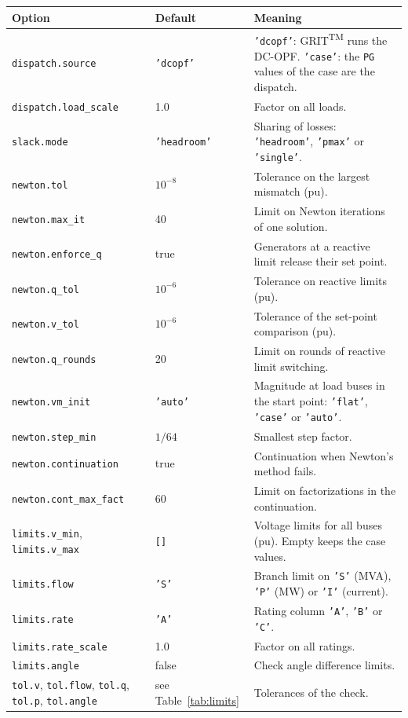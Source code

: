 \documentclass[a4paper,11pt]{article}
\newcommand{\TM}{\textsuperscript{TM}}
\newcommand{\GRIT}{GRIT\TM}
\newcommand{\opt}[1]{\texttt{#1}}
\begin{document}
\begin{longtable}{@{}p{4.2cm}p{2.0cm}p{8.6cm}@{}}
\toprule
\textbf{Option} & \textbf{Default} & \textbf{Meaning} \\
\midrule
\endhead
\opt{dispatch.source} & \texttt{'dcopf'} & \texttt{'dcopf'}: \GRIT{} runs the DC-OPF. \texttt{'case'}: the \texttt{PG} values of the case are the dispatch. \\
\opt{dispatch.load\_scale} & 1.0 & Factor on all loads. \\
\opt{slack.mode} & \texttt{'headroom'} & Sharing of losses: \texttt{'headroom'}, \texttt{'pmax'} or \texttt{'single'}. \\
\opt{newton.tol} & $10^{-8}$ & Tolerance on the largest mismatch (pu). \\
\opt{newton.max\_it} & 40 & Limit on Newton iterations of one solution. \\
\opt{newton.enforce\_q} & true & Generators at a reactive limit release their set point. \\
\opt{newton.q\_tol} & $10^{-6}$ & Tolerance on reactive limits (pu). \\
\opt{newton.v\_tol} & $10^{-6}$ & Tolerance of the set-point comparison (pu). \\
\opt{newton.q\_rounds} & 20 & Limit on rounds of reactive limit switching. \\
\opt{newton.vm\_init} & \texttt{'auto'} & Magnitude at load buses in the start point: \texttt{'flat'}, \texttt{'case'} or \texttt{'auto'}. \\
\opt{newton.step\_min} & $1/64$ & Smallest step factor. \\
\opt{newton.continuation} & true & Continuation when Newton's method fails. \\
\opt{newton.cont\_max\_fact} & 60 & Limit on factorizations in the continuation. \\
\opt{limits.v\_min}, \opt{limits.v\_max} & \texttt{[]} & Voltage limits for all buses (pu). Empty keeps the case values. \\
\opt{limits.flow} & \texttt{'S'} & Branch limit on \texttt{'S'} (MVA), \texttt{'P'} (MW) or \texttt{'I'} (current). \\
\opt{limits.rate} & \texttt{'A'} & Rating column \texttt{'A'}, \texttt{'B'} or \texttt{'C'}. \\
\opt{limits.rate\_scale} & 1.0 & Factor on all ratings. \\
\opt{limits.angle} & false & Check angle difference limits. \\
\opt{tol.v}, \opt{tol.flow}, \opt{tol.q}, \opt{tol.p}, \opt{tol.angle} & see Table~\ref{tab:limits} & Tolerances of the check. \\

\end{longtable}
\end{document}
